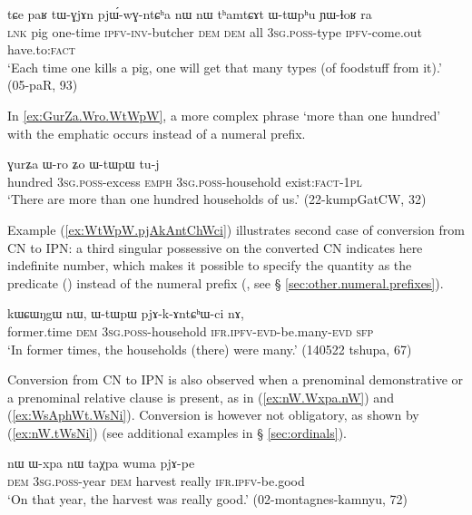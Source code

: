 \begin{exe}
\ex \label{ex:nW.thamtCAt.WtWphu}
\gll tɕe paʁ tɯ-ɣjɤn pjɯ́-wɣ-ntɕʰa nɯ nɯ tʰamtɕɤt ɯ-tɯpʰu ɲɯ-ɬoʁ ra \\ 
 \textsc{lnk} pig one-time \textsc{ipfv}-\textsc{inv}-butcher \textsc{dem} \textsc{dem} all \textsc{3sg}.\textsc{poss}-type \textsc{ipfv}-come.out have.to:\textsc{fact} \\
\glt `Each time one kills a pig, one will get that many types (of foodstuff from it).' (05-paR, 93)
\end{exe}

In \ref{ex:GurZa.Wro.WtWpW}, a more complex phrase  `more than one hundred' with the emphatic  occurs instead of a numeral prefix.

\begin{exe}
\ex \label{ex:GurZa.Wro.WtWpW}
\gll ɣurʑa ɯ-ro ʑo ɯ-tɯpɯ tu-j \\
 hundred \textsc{3sg}.\textsc{poss}-excess \textsc{emph} \textsc{3sg}.\textsc{poss}-household exist:\textsc{fact}-\textsc{1pl} \\
\glt `There are more than one hundred households of us.' (22-kumpGatCW, 32)
\end{exe}

Example (\ref{ex:WtWpW.pjAkAntChWci}) illustrates second case of conversion from CN to IPN: a third singular possessive on the converted CN indicates here indefinite number, which makes it possible to specify the quantity as the predicate () instead of the numeral prefix (, see § \ref{sec:other.numeral.prefixes}).

\begin{exe}
\ex \label{ex:WtWpW.pjAkAntChWci}
\gll kɯɕɯŋgɯ nɯ, ɯ-tɯpɯ pjɤ-k-ɤntɕʰɯ-ci nɤ, \\
 former.time \textsc{dem} \textsc{3sg}.\textsc{poss}-household \textsc{ifr}.\textsc{ipfv}-\textsc{evd}-be.many-\textsc{evd} \textsc{sfp} \\
\glt `In former times, the households (there) were many.' (140522 tshupa, 67)
\end{exe}

Conversion from CN to IPN is also observed when a prenominal demonstrative or a prenominal relative clause is present, as in (\ref{ex:nW.Wxpa.nW}) and (\ref{ex:WsAphWt.WsNi}). Conversion is however not obligatory, as shown by (\ref{ex:nW.tWsNi}) (see additional examples in § \ref{sec:ordinals}).

\begin{exe}
\ex \label{ex:nW.Wxpa.nW}
\gll nɯ ɯ-xpa nɯ taχpa wuma pjɤ-pe \\
\textsc{dem} \textsc{3sg}.\textsc{poss}-year \textsc{dem} harvest really \textsc{ifr}.\textsc{ipfv}-be.good \\
\glt `On that year, the harvest was really good.' (02-montagnes-kamnyu, 72)
\end{exe}


